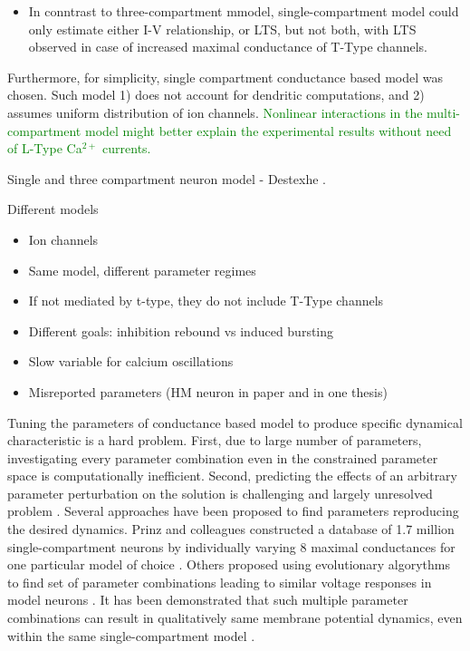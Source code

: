 \documentclass[../main.tex]{subfiles}
\begin{document}
\begin{itemize}
    \item In conntrast to three-compartment mmodel, single-compartment model could only estimate either I-V relationship, or LTS, but not both,
    with LTS observed in case of increased maximal conductance of T-Type channels. \parencite{destexheDendriticLowthresholdCalcium1998}
\end{itemize}

Furthermore, for simplicity, single compartment conductance based model was chosen.
Such model 1) does not account for dendritic computations, and 2) assumes uniform distribution of
ion channels. \textcolor{green}{Nonlinear interactions in the multi-compartment model might better explain
the experimental results without need of L-Type Ca$^{2+}$ currents.}

Single and three compartment neuron model - Destexhe \parencite{destexheDendriticLowthresholdCalcium1998}.

Different models
\begin{itemize}
    \item Ion channels
    \item Same model, different parameter regimes
    \item If not mediated by t-type, they do not include T-Type channels
    \item Different goals: inhibition rebound vs induced bursting
    \item Slow variable for calcium oscillations
    \item Misreported parameters (HM neuron in paper and in one thesis)
\end{itemize}

Tuning the parameters of conductance based model to produce specific dynamical characteristic is a hard problem. First, due to large number of parameters, investigating every parameter combination even in the constrained parameter space is computationally inefficient. Second, predicting the effects of an arbitrary parameter perturbation on the solution is challenging and largely unresolved problem \cite{alonsoVisualizationCurrentsNeural2019}. Several approaches have been proposed to find parameters reproducing the desired dynamics. Prinz and colleagues constructed a database of 1.7 million single-compartment neurons by individually varying $8$ maximal conductances for one particular model of choice \parencite{prinzAlternativeHandTuningConductanceBased2003}. Others proposed using evolutionary algorythms to find set of parameter combinations leading to similar voltage responses in model neurons \cite{alonsoVisualizationCurrentsNeural2019}. It has been demonstrated that such multiple parameter combinations can result in qualitatively same membrane potential dynamics, even within the same single-compartment model \cite{alonsoVisualizationCurrentsNeural2019}.
\end{document}
